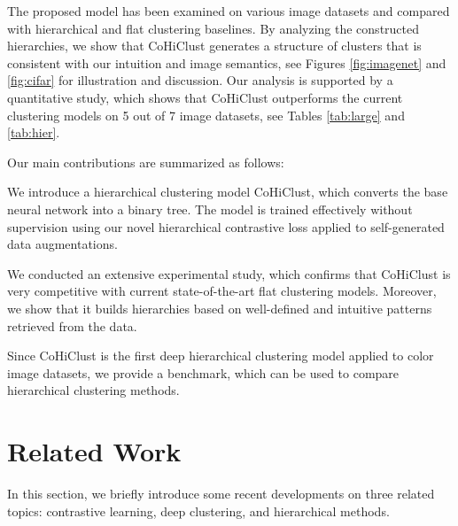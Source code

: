 \documentclass[runningheads]{llncs}
\def\our{CoHiClust}
\begin{document}
The proposed model has been examined on various image datasets and compared with hierarchical and flat clustering baselines. By analyzing the constructed hierarchies, we show that \our{} generates a structure of clusters that is consistent with our intuition and image semantics, see Figures \ref{fig:imagenet} and \ref{fig:cifar} for illustration and discussion. Our analysis is supported by a quantitative study, which shows that \our{} outperforms the current clustering models on 5 out of 7 image datasets, see Tables \ref{tab:large} and \ref{tab:hier}.



Our main contributions are summarized as follows:
\begin{compactitem}
    \item We introduce a hierarchical clustering model \our{}, which converts the base neural network into a binary tree. The model is trained effectively without supervision using our novel hierarchical contrastive loss applied to self-generated data augmentations.
    \item We conducted an extensive experimental study, which confirms that \our{} is very competitive with current state-of-the-art flat clustering models. Moreover, we show that it builds hierarchies based on well-defined and intuitive patterns retrieved from the data.
    \item Since \our{} is the first deep hierarchical clustering model applied to color image datasets, we provide a benchmark, which can be used to compare hierarchical clustering methods.
\end{compactitem}

\section{Related Work}

In this section, we briefly introduce some recent developments on three related topics: contrastive learning, deep clustering, and hierarchical methods.
\end{document}
